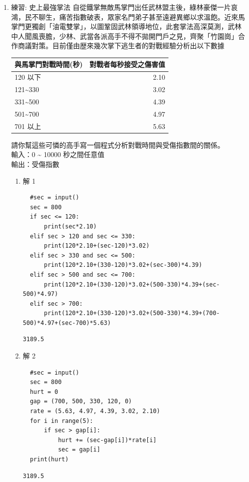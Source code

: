 \documentclass[a4paper,12pt]{article}
\begin{document}
\begin{enumerate}
\begin{enumerate}
\item 練習: 史上最強掌法
\label{sec:org5ba7a6e}
自從鐵掌無敵馬掌門出任武林盟主後，綠林豪傑一片哀鴻，民不聊生，痛苦指數破表，眾家名門弟子甚至遠避異鄉以求溫飽。近來馬掌門更獨創「油電雙掌」，以圖鞏固武林領導地位，此套掌法高深莫測，武林中人聞風喪膽，少林、武當各派高手不得不拋開門戶之見，齊聚「竹園崗」合作商議對策。目前僅由歴來幾次掌下逃生者的對戰經驗分析出以下數據\\
\begin{center}
\begin{tabular}{lr}
與馬掌門對戰時間(秒) & 對戰者每秒接受之傷害值\\
\hline
120 以下 & 2.10\\
121\textasciitilde{}330 & 3.02\\
331\textasciitilde{}500 & 4.39\\
501\textasciitilde{}700 & 4.97\\
701 以上 & 5.63\\
\end{tabular}
\end{center}
請你幫這些可憐的高手寫一個程式分析對戰時間與受傷指數間的關係。\\
輸入：0 \textasciitilde{} 10000 秒之間任意值\\
輸出：受傷指數\\

\begin{enumerate}
\item 解 1
\label{sec:org907f673}
\lstset{breaklines=true,language=Python,label= ,caption= ,captionpos=b,firstnumber=1,numbers=left}
\begin{lstlisting}
  #sec = input()
  sec = 800
  if sec <= 120:
      print(sec*2.10)
  elif sec > 120 and sec <= 330:
      print(120*2.10+(sec-120)*3.02)
  elif sec > 330 and sec <= 500:
      print(120*2.10+(330-120)*3.02+(sec-300)*4.39)
  elif sec > 500 and sec <= 700:
      print(120*2.10+(330-120)*3.02+(500-330)*4.39+(sec-500)*4.97)
  elif sec > 700:
      print(120*2.10+(330-120)*3.02+(500-330)*4.39+(700-500)*4.97+(sec-700)*5.63)
\end{lstlisting}

\begin{verbatim}
3189.5
\end{verbatim}

\item 解 2
\label{sec:orgd8da78a}
\lstset{breaklines=true,language=Python,label= ,caption= ,captionpos=b,firstnumber=1,numbers=left}
\begin{lstlisting}
  #sec = input()
  sec = 800
  hurt = 0
  gap = (700, 500, 330, 120, 0)
  rate = (5.63, 4.97, 4.39, 3.02, 2.10)
  for i in range(5):
      if sec > gap[i]:
          hurt += (sec-gap[i])*rate[i]
          sec = gap[i]
  print(hurt)
\end{lstlisting}

\begin{verbatim}
3189.5
\end{verbatim}
\end{enumerate}
\end{enumerate}
\end{enumerate}
\end{document}
